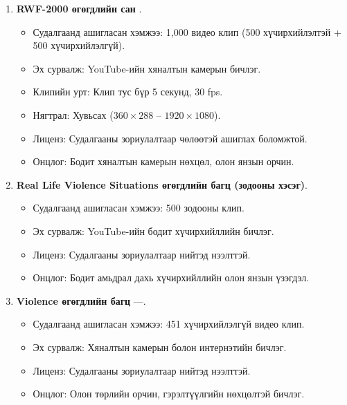 \begin{enumerate}
    \item \textbf{RWF-2000 өгөгдлийн сан} \cite{Cheng2021}.
    \begin{itemize}
        \item Судалгаанд ашигласан хэмжээ: 1,000 видео клип (500 хүчирхийлэлтэй + 500 хүчирхийлэлгүй).
        \item Эх сурвалж: YouTube-ийн хяналтын камерын бичлэг.
        \item Клипийн урт: Клип тус бүр 5 секунд, 30 fps.
        \item Нягтрал: Хувьсах ($360 \times 288$ -- $1920 \times 1080$).
        \item Лиценз: Судалгааны зориулалтаар чөлөөтэй ашиглах боломжтой.
        \item Онцлог: Бодит хяналтын камерын нөхцөл, олон янзын орчин.
    \end{itemize}

    \item \textbf{Real Life Violence Situations өгөгдлийн багц (зодооны хэсэг)}.
    \begin{itemize}
        \item Судалгаанд ашигласан хэмжээ: 500 зодооны клип.
        \item Эх сурвалж: YouTube-ийн бодит хүчирхийллийн бичлэг.
        \item Лиценз: Судалгааны зориулалтаар нийтэд нээлттэй.
        \item Онцлог: Бодит амьдрал дахь хүчирхийллийн олон янзын үзэгдэл.
    \end{itemize}

    \item \textbf{Violence өгөгдлийн багц} ---.
    \begin{itemize}
        \item Судалгаанд ашигласан хэмжээ: 451 хүчирхийлэлгүй видео клип.
        \item Эх сурвалж: Хяналтын камерын болон интернэтийн бичлэг.
        \item Лиценз: Судалгааны зориулалтаар нийтэд нээлттэй.
        \item Онцлог: Олон төрлийн орчин, гэрэлтүүлгийн нөхцөлтэй бичлэг.
    \end{itemize}
\end{enumerate}

